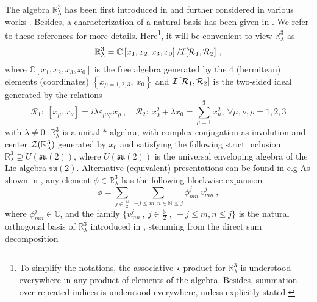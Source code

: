 \documentclass[10pt]{book}
\theoremstyle{break}
\begin{document}
The algebra $\mathbb{R}^3_\lambda$ has been first introduced in %
and further considered in various works %
. Besides, a characterization of a natural basis has been given in %
. We refer to these references for more details. Here{\footnote{To simplify the notations, the associative $\star$-product for $\mathbb{R}^3_\lambda$ is understood everywhere in any product of elements of the algebra. Besides, summation over repeated indices is understood everywhere, unless explicitly stated.}}, it will be convenient to view $\mathbb{R}^3_\lambda$ as %
%
\begin{equation*}
\mathbb{R}^3_\lambda=\mathbb{C}\left[x_1,x_2,x_3,x_0\right]/{\mathcal{I}}[{\mathcal{R}}_1,{\cal{R}}_2] \ , %
\end{equation*}
%
where $\mathbb{C}\left[x_1,x_2,x_3,x_0\right]$ is the free algebra generated by the 4 (hermitean) elements (coordinates) $\left\{x_{\mu=1,2,3},\ x_0\right\}$ and ${\mathcal{I}}\left[{\mathcal{R}}_1,{\cal{R}}_2\right]$ is the two-sided ideal generated by the relations%
%
\begin{equation*}
{\mathcal{R}}_1: \ [x_\mu,x_\nu] = i \lambda \varepsilon_{\mu\nu\rho} x_\rho \ , \quad
{\mathcal{R}}_2: \ x_0^2 + \lambda x_0 = \sum_{\mu=1}^3 x_\mu^2,\ \forall \mu,\nu,\rho=1,2,3%
\end{equation*}
%
with $\lambda\ne0$. $\mathbb{R}^3_\lambda$ is a unital $*$-algebra, with complex conjugation as involution and center ${\cal{Z}}(\mathbb{R}^3_\lambda)$ generated by $x_0$ and satisfying the following strict inclusion $\mathbb{R}^3_\lambda\supsetneq U(\mathfrak{su}(2))$, where $U(\mathfrak{su}(2))$ is the universal enveloping algebra of the Lie algebra ${\mathfrak{su}}(2)$. Alternative (equivalent) presentations can be found in e.g %
%
As shown in %
, any element $\phi\in\mathbb{R}^3_\lambda$ has the following blockwise expansion%
%
\begin{equation*}
\phi = \sum_{j\in\frac{\mathbb{N}}{2}} \ \sum_{-j\le m,n\in\mathbb{N}\le j} \phi^j_{mn} \ v^j_{mn} \ , %
\end{equation*}
%
where $\phi^j_{mn}\in\mathbb{C}$, and the family $\{v^j_{mn} \ , \ j\in\frac{\mathbb{N}}{2} \ ,\ -j\le m,n\le j\}$ is the natural orthogonal basis of $\mathbb{R}^3_\lambda$ introduced in %
, stemming from the direct sum decomposition%
\end{document}
